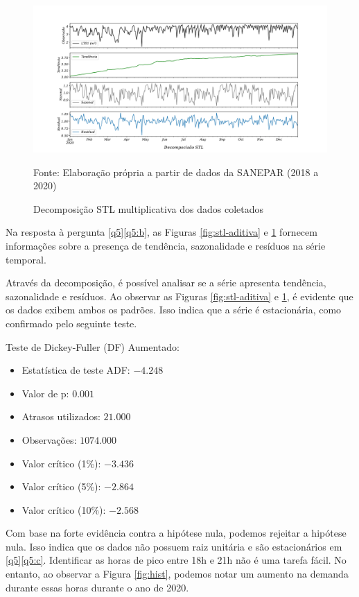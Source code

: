 \begin{figure}[H]
	\centering
	\caption{Decomposição STL multiplicativa dos dados coletados}
	\label{fig:stl}
	\includegraphics[width=0.9\linewidth]{Resultados/Figuras/STL}
	
	Fonte: Elaboração própria a partir de dados da SANEPAR (2018 a 2020)
\end{figure}

Na resposta à pergunta \ref{q5}\ref{q5:b}, as Figuras \ref{fig:stl-aditiva} e \ref{fig:stl} fornecem informações sobre a presença de tendência, sazonalidade e resíduos na série temporal.

Através da decomposição, é possível analisar se a série apresenta tendência, sazonalidade e resíduos. Ao observar as Figuras \ref{fig:stl-aditiva} e \ref{fig:stl}, é evidente que os dados exibem ambos os padrões. Isso indica que a série é estacionária, como confirmado pelo seguinte teste.

Teste de Dickey-Fuller (DF) Aumentado:
\begin{itemize}
	\item Estatística de teste ADF: $-4.248$
	\item Valor de p: $0.001$
	\item Atrasos utilizados: $21.000$
	\item Observações: $1074.000$
	\item Valor crítico (1\%): $-3.436$
	\item Valor crítico (5\%): $-2.864$
	\item Valor crítico (10\%): $-2.568$
\end{itemize}

Com base na forte evidência contra a hipótese nula, podemos rejeitar a hipótese nula. Isso indica que os dados não possuem raiz unitária e são estacionários em \ref{q5}\ref{q5:c}. Identificar as horas de pico entre 18h e 21h não é uma tarefa fácil. No entanto, ao observar a Figura \ref{fig:hist}, podemos notar um aumento na demanda durante essas horas durante o ano de 2020.
	
